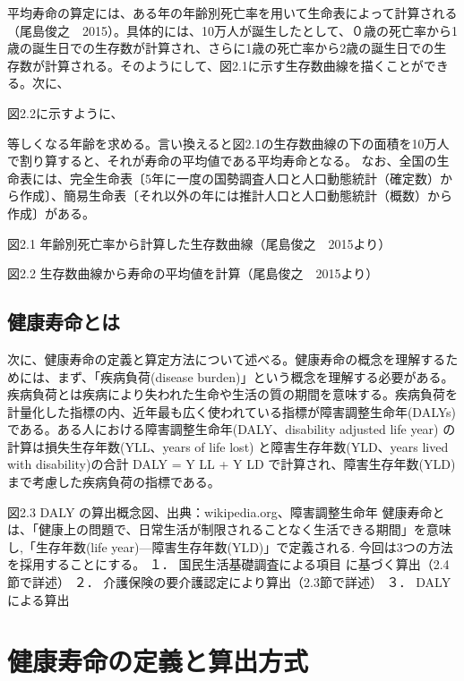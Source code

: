 平均寿命の算定には、ある年の年齢別死亡率を用いて生命表によって計算される（尾島俊之　2015）。具体的には、10万人が誕生したとして、０歳の死亡率から1歳の誕生日での生存数が計算され、さらに1歳の死亡率から2歳の誕生日での生存数が計算される。そのようにして、図2.1に示す生存数曲線を描くことができる。次に、

図2.2に示すように、

等しくなる年齢を求める。言い換えると図2.1の生存数曲線の下の面積を10万人で割り算すると、それが寿命の平均値である平均寿命となる。
なお、全国の生命表には、完全生命表〔5年に一度の国勢調査人口と人口動態統計（確定数）から作成〕、簡易生命表〔それ以外の年には推計人口と人口動態統計（概数）から作成〕がある。



図2.1 年齢別死亡率から計算した生存数曲線（尾島俊之　2015より）

図2.2 生存数曲線から寿命の平均値を計算（尾島俊之　2015より）




\subsection{健康寿命とは}


次に、健康寿命の定義と算定方法について述べる。健康寿命の概念を理解するためには、まず、「疾病負荷(disease burden)」という概念を理解する必要がある。疾病負荷とは疾病により失われた生命や生活の質の期間を意味する。疾病負荷を計量化した指標の内、近年最も広く使われている指標が障害調整生命年(DALYs) である。ある人における障害調整生命年(DALY、disability adjusted life year) の計算は損失生存年数(YLL、years of life lost) と障害生存年数(YLD、years lived with disability)の合計
DALY = Y LL + Y LD
で計算され、障害生存年数(YLD)まで考慮した疾病負荷の指標である。

図2.3 DALY の算出概念図、出典：wikipedia.org、障害調整生命年
健康寿命とは、「健康上の問題で、日常生活が制限されることなく生活できる期間」を意味し,「生存年数(life year)—障害生存年数(YLD)」で定義される.
今回は3つの方法を採用することにする。
１．	国民生活基礎調査による項目  に基づく算出（2.4節で詳述）
２．	介護保険の要介護認定により算出（2.3節で詳述）
３．	DALYによる算出


\section{健康寿命の定義と算出方式}

